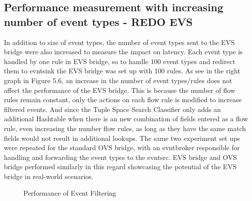 \subsection{Performance measurement with increasing number of event types - REDO EVS}	
In addition to size of event types, the number of event types sent to the EVS bridge were also increased to measure the impact on latency. Each event type is handled by one rule in EVS bridge, so to handle 100 event types and redirect them to evntsink the EVS bridge was set up with 100 rules. As see in the right graph in Figure 5.6, an increase in the number of event types/rules does not affect the performance of the EVS bridge. This is because the number of flow rules remain constant, only the actions on each flow rule is modified to increase filtered events. And since the Tuple Space Search Classifier only adds an additional Hashtable when there is an new combination of fields entered as a flow rule, even increasing the number flow rules, as long as they have the same match fields would not result in additional lookups.
The same two experiment set ups were repeated for the standard OVS bridge, with an evntbroker responsible for handling and forwarding the event types to the evntsrc. EVS bridge and OVS bridge performed similarly in this regard showcasing the potential of the EVS bridge in real-world scenarios.



\begin{figure}[H]
	\centering
	\caption{Performance of Event Filtering}
\end{figure}	

